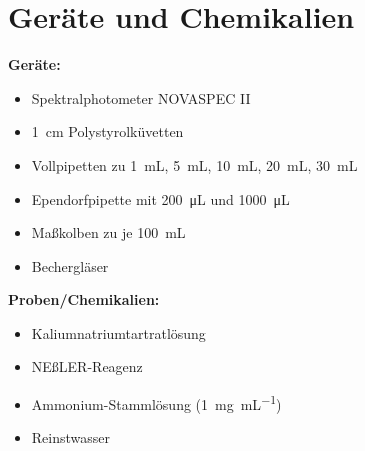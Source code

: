 \newpage
\section{Geräte und Chemikalien}
\label{sec:geraete}

\textbf{Geräte:}
\begin{itemize}
\item Spektralphotometer NOVASPEC II
\item \SI{1}{\centi\meter} Polystyrolküvetten
\item Vollpipetten zu \SI{1}{\milli\liter}, \SI{5}{\milli\liter}, \SI{10}{\milli\liter}, \SI{20}{\milli\liter}, \SI{30}{\milli\liter}
\item Ependorfpipette mit \SI{200}{\micro\liter} und \SI{1000}{\micro\liter}
\item Maßkolben zu je \SI{100}{\milli\liter}
\item Bechergläser

\end{itemize}

\vspace*{5mm}

\textbf{Proben/Chemikalien:}
\begin{itemize}
\item Kaliumnatriumtartratlösung
\item NEßLER-Reagenz
\item Ammonium-Stammlösung (\SI{1}{\milli\gram\per\milli\liter})
\item Reinstwasser
\end{itemize}





